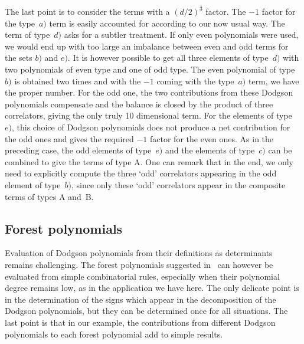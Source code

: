 \documentclass[pdftex]{sigma}
\numberwithin{equation}{section}
\begin{document}
The last point is to consider the terms with a $(d/2)^{\bar 3}$ factor. The $-1$ factor for the type~$a)$
term is easily accounted for according to our now usual way. The term of type~$d)$ asks for a subtler
treatment. If only even polynomials were used, we would end up with too large an imbalance between even and odd
terms for the sets $b)$ and $e)$. It is however possible to get all three elements of type~$d)$ with two
polynomials of even type and one of odd type. The even polynomial of type~$b)$ is obtained two times and with
the $-1$ coming with the type~$a)$ term, we have the proper number. For the odd one, the two contributions
from these Dodgson polynomials compensate and the balance is closed by the product of three correlators, giving
the only truly 10 dimensional term.
For the elements of type~$e)$, this choice of Dodgson polynomials does not produce a net contribution for the
odd ones and gives the required $-1$ factor for the even ones. As in the preceding case, the odd elements of
type~$e)$ and the elements of type~$c)$ can be combined to give the terms of type A. One can remark that
in the end, we only need to explicitly compute the three `odd'
correlators appearing in the odd element of type~$b)$, since only these `odd' correlators appear in the composite terms of types
A and~B.

\subsection{Forest polynomials}

Evaluation of Dodgson polynomials from their definitions as determinants remains challenging. The forest
polynomials suggested in~\cite{BrYe09} can however be evaluated from simple combinatorial rules, especially when
their polynomial degree remains low, as in the application we have here. The only delicate point is in the
determination of the signs which appear in the decomposition of the Dodgson polynomials, but they can be
determined once for all situations. The last point is that in our example, the contributions from different
Dodgson polynomials to each forest polynomial add to simple results.
\end{document}
